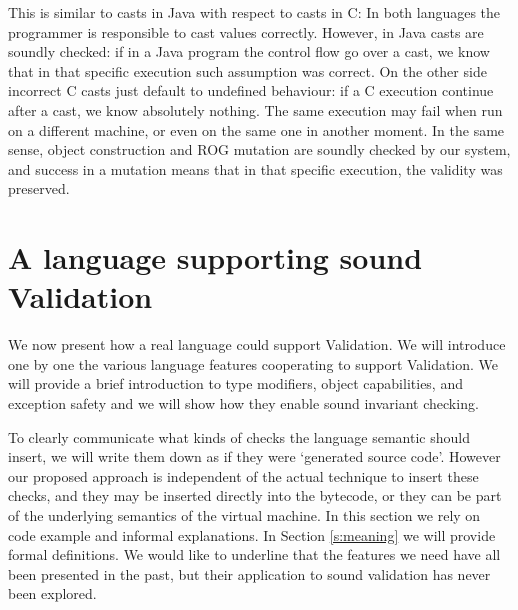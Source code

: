 This is similar to casts in Java with respect to casts in C:
In both languages the programmer is responsible to cast values correctly.
However, in Java casts are soundly checked: if in a Java program the control flow go over a cast,
we know that in that specific
execution such assumption was correct.
On the other side incorrect C casts just default to undefined behaviour:
if a C execution continue after a cast, we know absolutely nothing. The same execution
may fail when run on a different machine, 
or even on the same one in another moment.
In the same sense, object construction and ROG mutation are soundly checked by our system,
and success in a mutation means that in that specific execution, the validity was preserved.




%
%  
% 
%
%
%
%
%
%
%
%
%
%
%
%
%
%
%
%
%



\saveSpace
\section{A language supporting sound Validation}
\label{s:language}
\saveSpace
We now present how a real language could support
Validation. 
We will introduce one by one the various
language features cooperating
to support Validation.%
We will provide a brief introduction to type modifiers, object capabilities, and exception safety and we will show how they enable sound invariant checking.

To clearly communicate what kinds of checks the language semantic should insert,
 we will write them down as if they were `generated source code'. 
However our proposed approach is independent of the actual technique to insert these checks, and they may be inserted directly into the bytecode, or they can be part of the underlying semantics of the virtual machine.
In this section we rely on code example and informal explanations. In Section \ref{s:meaning} we will provide formal definitions.
We would like to underline that the
features we need have all been presented in the past, but their application to sound validation has never been explored.



